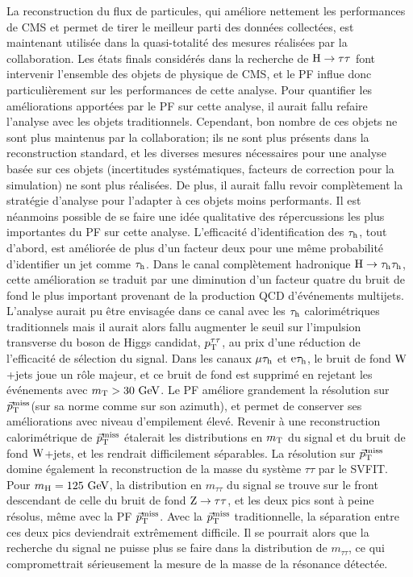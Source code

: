 \documentclass[11pt,twoside,a4paper,tdr]{cms-tdr}
\newcommand{\tauh}{\tau_{\rm h}}
\newcommand{\vecptmiss}{\ensuremath{\vec{p}_\textrm{T}^{\rm miss}}\xspace}
\begin{document}
La reconstruction du flux de particules, qui améliore nettement les performances de CMS et permet de tirer le meilleur parti des données collectées, est maintenant utilisée dans la quasi-totalité des mesures réalisées par la collaboration. 
Les états finals considérés dans la recherche de $\mathrm{H} \to \tau \tau$ font intervenir l'ensemble des objets de physique de CMS, et le PF influe donc particulièrement sur les performances de cette analyse. 
Pour quantifier les améliorations apportées par le PF sur cette analyse, il aurait fallu refaire l'analyse avec les objets traditionnels.
Cependant, bon nombre de ces objets ne sont plus maintenus par la collaboration; ils ne sont plus présents dans la reconstruction standard, et les diverses mesures nécessaires pour une analyse basée sur ces objets (incertitudes systématiques, facteurs de correction pour la simulation) ne sont plus réalisées. 
De plus, il aurait fallu revoir complètement la stratégie d'analyse pour l'adapter à ces objets moins performants. 
Il est néanmoins possible de se faire une idée qualitative des répercussions les plus importantes du PF sur cette analyse. 
L'efficacité d'identification des $\tauh$, tout d'abord, est améliorée de plus d'un facteur deux pour une même probabilité d'identifier un jet comme $\tauh$. 
Dans le canal complètement hadronique $\PH \to \tauh \tauh$, cette amélioration se traduit par une diminution d'un facteur quatre du bruit de fond le plus important provenant de la production QCD d'événements multijets. 
L'analyse aurait pu être envisagée dans ce canal avec les $\tauh$ calorimétriques traditionnels
mais il aurait alors fallu augmenter le seuil sur l'impulsion transverse du boson de Higgs candidat, $p_{\rm T}^{\tau \tau}$, 
au prix d'une réduction de l'efficacité de sélection du signal.   
Dans les canaux $\mu \tauh$ et $\Pe \tauh$, le bruit de fond $\mathrm{W}$+jets joue un rôle majeur, 
et ce bruit de fond est supprimé en rejetant les événements avec $m_{\rm T}>30\,\,\text{Ge\hspace{-.08em}V}$. 
Le PF améliore grandement la résolution sur \vecptmiss (sur sa norme comme sur son azimuth), 
et permet de conserver ses améliorations avec niveau d'empilement élevé. 
Revenir à une reconstruction calorimétrique de \vecptmiss étalerait les distributions en $m_{\rm T}$ 
du signal et du bruit de fond $\mathrm{W}$+jets, et les rendrait difficilement séparables. 
La résolution sur \vecptmiss domine également la reconstruction de la masse du système $\tau \tau$ par le {\sc SVFIT}.
Pour $m_{\rm H} = 125\,\,\text{Ge\hspace{-.08em}V}$, la distribution en $m_{\tau\tau}$ du signal se trouve sur le front descendant de celle du bruit de fond 
$\mathrm{Z} \to \tau \tau$, et les deux pics sont à peine résolus, même avec la PF \vecptmiss.
Avec la \vecptmiss traditionnelle, la séparation entre ces deux pics deviendrait extrêmement difficile. 
Il se pourrait alors que la recherche du signal ne puisse plus se faire dans la distribution de $m_{\tau\tau}$,  
ce qui compromettrait sérieusement la mesure de la masse de la résonance détectée. 
\end{document}
